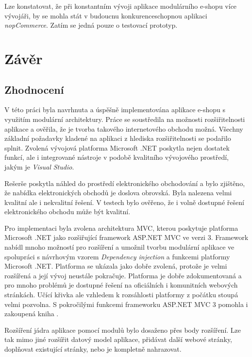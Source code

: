\documentclass[11pt,twoside,a4paper]{book}
\begin{document}
Lze konstatovat, že při konstantním vývoji aplikace modulárního e-shopu více vývojáři, by se mohla stát v budoucnu konkurenceschopnou aplikaci \textit{nopCommerce}. Zatím se jedná pouze o testovací prototyp.


\chapter{Závěr}
\label{sec:zaver}

\section{Zhodnocení}

V této práci byla navrhnuta a úspěšně implementována aplikace e-shopu s využitím modulární architektury. Práce se soustředila na možnosti rozšiřitelnosti aplikace a ověřila, že je tvorba takového internetového obchodu možná. Všechny základní požadavky kladené na aplikaci z hlediska rozšiřitelnosti se podařilo splnit. Zvolená vývojová platforma Microsoft .NET poskytla nejen dostatek funkcí, ale i integrované nástroje v podobě kvalitního vývojového prostředí, jakým je \textit{Visual Studio}.

Rešerše poskytla náhled do prostředí elektronického obchodování a bylo zjištěno, že nabídka elektronických obchodů je doslova obrovská. Byla nalezena velmi kvalitní ale i nekvalitní řešení. V testech bylo ověřeno, že i volně dostupné řešení elektronického obchodu může být kvalitní.

Pro implementaci byla zvolena architektura MVC, kterou poskytuje platforma Microsoft .NET jako rozšiřující framework ASP.NET MVC ve verzi 3. Framework nabídl mnoho možností pro rozšíření a umožnil tvorbu modulární aplikace ve spolupráci s návrhovým vzorem \textit{Dependency injection} a funkcemi platformy Microsoft .NET. Platforma se ukázala jako dobře zvolená, protože je velmi rozšířená a její vývoj neustále pokračuje. Platforma je dobře zdokumentovaná a pro mnoho problémů je dostupné řešení na oficiálních i komunitních webových stránkách. Učící křivka ale vzhledem k rozsáhlosti platformy z počátku stoupá velmi pozvolna. S pokročilými funkcemi frameworku ASP.NET MVC 3 pomohla i zakoupená kniha \cite{MVC1}.

Rozšíření jádra aplikace pomocí modulů bylo dosaženo přes body rozšíření. Lze tak mimo jiné rozšířit datový model aplikace, přidávat další webové stránky, doplňovat existující stránky, nebo je kompletně nahrazovat. 
\end{document}
